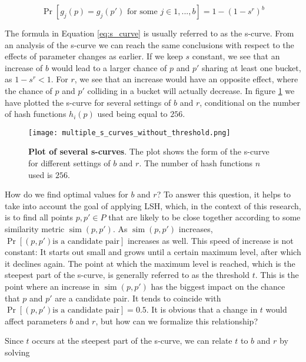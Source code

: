 \begin{equation}
    \operatorname{Pr}[g_j(p)=g_j(p') \text{ for some } j\in{1,...,b}] = 1 - (1-s^r)^b
    \label{eq:s_curve}
\end{equation}

The formula in Equation \ref{eq:s_curve} is usually referred to as the s-curve. From an analysis of the s-curve we can reach the same conclusions with respect to the effects of parameter changes as earlier. If we keep $s$ constant, we see that an increase of $b$ would lead to a larger chance of $p$ and $p'$ sharing at least one bucket, as $1-s^r < 1$. For $r$, we see that an increase would have an opposite effect, where the chance of $p$ and $p'$ colliding in a bucket will actually decrease. In figure \ref{fig:multiple_s_curves} we have plotted the s-curve for several settings of $b$ and $r$, conditional on the number of hash functions $h_i(p)$ used being equal to $256$. 

\begin{figure}
    \texttt{[image: multiple\_s\_curves\_without\_threshold.png]}
    \caption[Plot of several s-curves]{\textbf{Plot of several s-curves}. The plot shows the form of the s-curve for different settings of $b$ and $r$. The number of hash functions $n$ used is $256$.}
    \label{fig:multiple_s_curves}
\end{figure}

How do we find optimal values for $b$ and $r$? To answer this question, it helps to take into account the goal of applying LSH, which, in the context of this research, is to find all points $p,p' \in P$ that are likely to be close together according to some similarity metric $\operatorname{sim}(p, p')$. As $\operatorname{sim}(p, p')$ increases, $\operatorname{Pr}[(p,p') \text{is a candidate pair}]$ increases as well. This speed of increase is not constant: It starts out small and grows until a certain maximum level, after which it declines again. The point at which the maximum level is reached, which is the steepest part of the s-curve, is generally referred to as the threshold $t$. This is the point where an increase in $\operatorname{sim}(p, p')$ has the biggest impact on the chance that $p$ and $p'$ are a candidate pair. It tends to coincide with $\operatorname{Pr}[(p,p') \text{is a candidate pair}] = 0.5$. It is obvious that a change in $t$ would affect parameters $b$ and $r$, but how can we formalize this relationship?

Since $t$ occurs at the steepest part of the s-curve, we can relate $t$ to $b$ and $r$ by solving

